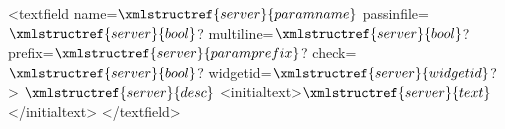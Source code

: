 <textfield name=$\xmlstructref{server}{paramname}$ passinfile=$\xmlstructref{server}{bool}$? multiline=$\xmlstructref{server}{bool}$? prefix=$\xmlstructref{server}{paramprefix}$? 
         check=$\xmlstructref{server}{bool}$? widgetid=$\xmlstructref{server}{widgetid}$? >
  $\xmlstructref{server}{desc}$
  <initialtext>$\xmlstructref{server}{text}$</initialtext>
</textfield>
